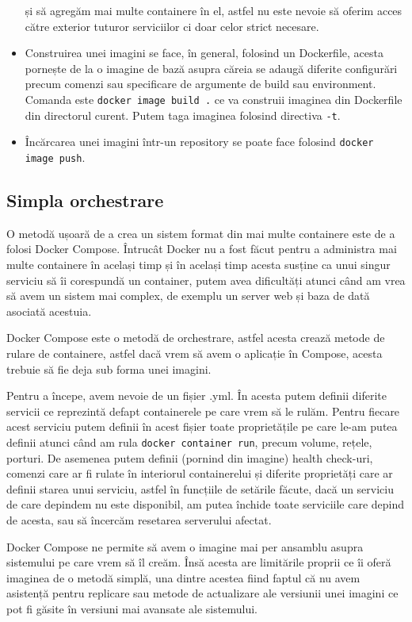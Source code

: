 \begin{itemize}
și să agregăm mai multe containere în el, astfel nu este nevoie să oferim acces către exterior tuturor 
serviciilor ci doar celor strict necesare.
    \item Construirea unei imagini se face, în general, folosind un Dockerfile, acesta pornește
de la o imagine de bază asupra căreia se adaugă diferite configurări precum comenzi sau specificare
de argumente de build sau environment. Comanda este \verb|docker image build .| ce va 
construii imaginea din Dockerfile din directorul curent. Putem taga imaginea folosind directiva 
\verb|-t|.
    \item Încărcarea unei imagini într-un repository se poate face folosind \verb|docker image push|.
\end{itemize}

\subsection{Simpla orchestrare}

O metodă ușoară de a crea un sistem format din mai multe containere este de a folosi
Docker Compose. Întrucât Docker nu a fost făcut pentru a administra mai multe containere
în același timp și în același timp acesta susține ca unui singur serviciu să îi corespundă
un container, putem avea dificultăți atunci când am vrea să avem un sistem mai complex,
de exemplu un server web și baza de dată asociată acestuia.

Docker Compose este o metodă de orchestrare, astfel acesta crează metode de rulare de containere,
astfel dacă vrem să avem o aplicație în Compose, acesta trebuie să fie deja 
sub forma unei imagini.

Pentru a începe, avem nevoie de un fișier .yml. În acesta putem definii diferite
servicii ce reprezintă defapt containerele pe care vrem să le rulăm. Pentru fiecare
acest serviciu putem definii în acest fișier toate proprietățile pe care le-am putea
definii atunci când am rula \verb|docker container run|, precum volume, rețele, porturi.
De asemenea putem definii (pornind din imagine) health check-uri, comenzi care ar fi rulate
în interiorul containerelui și diferite proprietăți care ar definii starea unui serviciu, astfel
în funcțiile de setările făcute, dacă un serviciu de care depindem nu este disponibil, am putea
închide toate serviciile care depind de acesta, sau să încercăm resetarea serverului afectat.

Docker Compose ne permite să avem o imagine mai per ansamblu asupra sistemului pe care vrem să îl creăm.
Însă acesta are limitările proprii ce îi oferă imaginea de o metodă simplă, una dintre acestea
fiind faptul că nu avem asistență pentru replicare sau metode de actualizare ale versiunii unei imagini ce
pot fi găsite în versiuni mai avansate ale sistemului.

